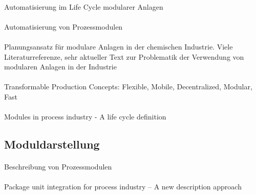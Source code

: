\paragraph*{\cite{Obst_2013b}} Automatisierung im Life Cycle modularer Anlagen

\paragraph*{\cite{Urbas_2012a}} Automatisierung von Prozessmodulen

\paragraph*{\cite{Fleischer_2016}} Planungsansatz f{\"u}r modulare Anlagen in der chemischen Industrie. Viele Literaturreferenze, sehr aktueller Text zur Problematik der Verwendung von modularen Anlagen in der Industrie

\paragraph{\cite{Lier_2016a}} Transformable Production Concepts: Flexible, Mobile, Decentralized, Modular, Fast

\paragraph*{\cite{Hohmann_2017}} Modules in process industry - A life cycle definition

\subsection{Moduldarstellung}

\paragraph*{\cite{Wassilew_2017}}

\paragraph*{\cite{Obst_2015}} Beschreibung von Prozessmodulen

\paragraph*{\cite{Obst_2014}}Package unit integration for process industry -- A new description approach

